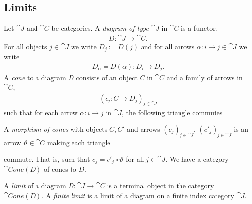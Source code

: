 \documentclass{article}
\begin{document}
\subsection{Limits}

\begin{definition}
    Let $\cat J$ and $\cat C$ be categories. A \emph{diagram of type} $\cat J$
    in $\cat C$ is a functor. 
    \begin{align*}
        D:\cat J \to \cat C.
    \end{align*}
    For all objects $j\in\cat J$ we write $D_j:=D(j)$ and for all arrows
    $\alpha:i\to j\in\cat J$ we write
    \begin{align*}
        D_\alpha = D(\alpha):D_i\to D_j.
    \end{align*}
    A \emph{cone} to a diagram $D$ consists of an object $C$ in $\cat C$ and
    a family of arrows in $\cat C$,
    \begin{align*}
        \left(c_j:C\to D_j\right)_{j\in\cat J}
    \end{align*}
    such that for each arrow $\alpha:i\to j$ in $\cat J$, 
    the following triangle commutes
    \begin{center}
    \end{center}
    A \emph{morphism of cones} with objects $C,C'$ and arrows
    $\left(c_j\right)_{j\in\cat J}$, $\left(c'_j\right)_{j\in\cat J}$
    is an arrow $\vartheta\in\cat C$ making each triangle
    \begin{center}
    \end{center}
    commute. That is, such that $c_j = c'_j \circ \vartheta$ for all $j\in\cat J$.
    We have a category $\cat{Cone}(D)$ of cones to $D$.
\end{definition}

\begin{definition}[Awodey p. 102]
    A \emph{limit} of a diagram $D:\cat J \to \cat C$ is a terminal object in the
    category $\cat{Cone}(D)$. A \emph{finite limit} is a limit of a diagram on
    a finite index category $\cat J$.
\end{definition} 
\end{document}
